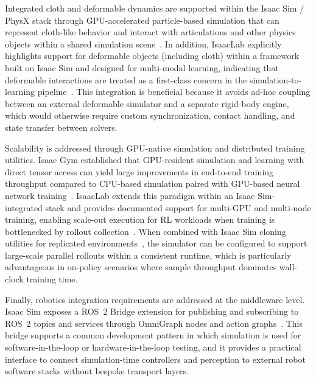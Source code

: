 Integrated cloth and deformable dynamics are supported within the Isaac Sim / PhysX stack through GPU-accelerated particle-based simulation that can represent cloth-like behavior and interact with articulations and other physics objects within a shared simulation scene~\cite{omni_physics_particles}. In addition, IsaacLab explicitly highlights support for deformable objects (including cloth) within a framework built on Isaac Sim and designed for multi-modal learning, indicating that deformable interactions are treated as a first-class concern in the simulation-to-learning pipeline~\cite{Mittal2025IsaacLab}. This integration is beneficial because it avoids ad-hoc coupling between an external deformable simulator and a separate rigid-body engine, which would otherwise require custom synchronization, contact handling, and state transfer between solvers. %

Scalability is addressed through GPU-native simulation and distributed training utilities. Isaac Gym established that GPU-resident simulation and learning with direct tensor access can yield large improvements in end-to-end training throughput compared to CPU-based simulation paired with GPU-based neural network training~\cite{Makoviychuk2021IsaacGym}. IsaacLab extends this paradigm within an Isaac Sim-integrated stack and provides documented support for multi-\ac{GPU} and multi-node training, enabling scale-out execution for \ac{RL} workloads when training is bottlenecked by rollout collection~\cite{Mittal2025IsaacLab,isaaclab_multi_gpu_multinode}. When combined with Isaac Sim cloning utilities for replicated environments~\cite{nvidia_isaac_sim_510_extensions_api}, the simulator can be configured to support large-scale parallel rollouts within a consistent runtime, which is particularly advantageous in on-policy scenarios where sample throughput dominates wall-clock training time.

Finally, robotics integration requirements are addressed at the middleware level. Isaac Sim exposes a \ac{ROS}~2 Bridge extension for publishing and subscribing to \ac{ROS}~2 topics and services through OmniGraph nodes and action graphs~\cite{nvidia_isaac_sim_510_extensions_api}. This bridge supports a common development pattern in which simulation is used for software-in-the-loop or hardware-in-the-loop testing, and it provides a practical interface to connect simulation-time controllers and perception to external robot software stacks without bespoke transport layers.

